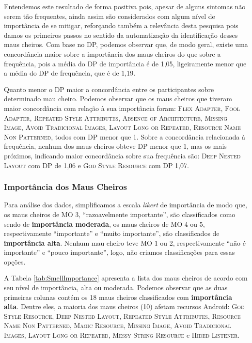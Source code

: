 Entendemos este resultado de forma positiva pois, apesar de alguns sintomas não serem tão frequentes, ainda assim são considerados com algum nível de importância de se mitigar, reforçando também a relevância desta pesquisa pois damos os primeiros passos no sentido da automatização da identificação desses maus cheiros. Com base no DP, podemos observar que, de modo geral, existe uma concordância maior sobre a importância dos maus cheiros do que sobre a frequência, pois a média do DP de importância é de 1,05, ligeiramente menor que a média do DP de frequência, que é de 1,19.

Quanto menor o DP maior a concordância entre os participantes sobre determinado mau cheiro. Podemos observar que os maus cheiros que tiveram maior concordância com relação à sua importância foram: \textsc{\small Flex Adapter}, \textsc{\small Fool Adapter}, \textsc{\small Repeated Style Attributes}, \textsc{\small Absence of Architecture}, \textsc{\small Missing Image}, \textsc{\small Avoid Tradicional Images}, \textsc{\small Layout Long or Repeated}, \textsc{\small Resource Name Non Patterned}, todos com DP menor que 1. Sobre a concordância relacionada à frequência, nenhum dos maus cheiros obteve DP menor que 1, mas os mais próximos, indicando maior concordância sobre sua frequência são: \textsc{\small Deep Nested Layout} com DP de 1,06 e \textsc{\small God Style Resource} com DP 1,07.


\subsubsection{Importância dos Maus Cheiros}

Para análise dos dados, simplificamos a escala \textit{likert} de importância de modo que, os maus cheiros de MO 3, ``razoavelmente importante'', são classificados como sendo de \textbf{\small importância moderada}, os maus cheiros de MO 4 ou 5, respectivamente ``importante'' e ``muito importante'', são classificados de \textbf{\small importância alta}. Nenhum mau cheiro teve MO 1 ou 2, respectivamente ``não é importante'' e ``pouco importante'', logo, não criamos classificações para essas opções.

A Tabela \ref{tab:SmellImportance} apresenta a lista dos maus cheiros de acordo com seu nível de importância, alta ou moderada. Podemos observar que as duas primeiras colunas contém os 18 maus cheiros classificados com \textbf{\small importância alta}. Dentre eles, a maioria dos maus cheiros (10) afetam recursos Android: \textsc{\small God Style Resource}, \textsc{\small Deep Nested Layout}, \textsc{\small Repeated Style Attributes}, \textsc{\small Resource Name Non Patterned}, \textsc{\small Magic Resource}, \textsc{\small Missing Image}, \textsc{\small Avoid Tradicional Images}, \textsc{\small Layout Long or Repeated}, \textsc{\small Messy String Resource} e \textsc{\small Hided Listener}.

